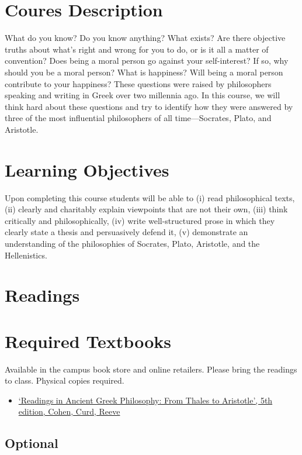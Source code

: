 \documentclass[article,oneside]{memoir}
\begin{document}
\section{Coures Description}

What do you know? Do you know anything? What exists? Are there objective truths about what’s right and wrong for you to do, or is it all a matter of convention? Does being a moral person go against your self-interest? If so, why should you be a moral person? What is happiness? Will being a moral person contribute to your happiness? These questions were raised by philosophers speaking and writing in Greek over two millennia ago. In this course, we will think hard about these questions and try to identify how they were answered by three of the most influential philosophers of all time---Socrates, Plato, and Aristotle. 

\section{Learning Objectives}

Upon completing this course students will be able to (i) read
philosophical texts, (ii) clearly and charitably explain viewpoints that
are not their own, (iii) think critically and philosophically, (iv)
write well-structured prose in which they clearly state a thesis and
persuasively defend it, (v) demonstrate an understanding of the
philosophies of Socrates, Plato, Aristotle, and the Hellenistics.


\section{Readings}
\section{Required Textbooks}

Available in the campus book store and online retailers. Please bring the readings to class. Physical copies required.
\begin{itemize}
\item \href{https://www.amazon.com/Readings-Ancient-Greek-Philosophy-Aristotle/dp/1624665322/ref=dp_ob_title_bk}{`Readings in Ancient Greek Philosophy: From Thales to Aristotle', 5th edition, Cohen, Curd, Reeve}

\end{itemize}
\subsection{Optional}
\end{document}
